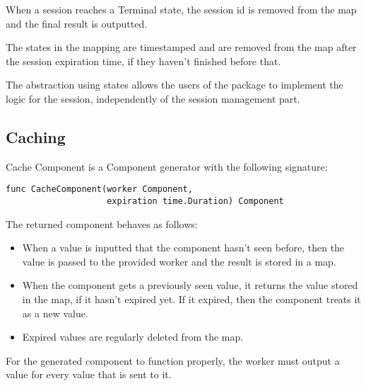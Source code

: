 \documentclass[12pt,a4paper]{article}
\begin{document}
When a session reaches a Terminal state, the session id is removed from the map
and the final result is outputted.

The states in the mapping are timestamped and are removed from the map after
the session expiration time, if they haven't finished before that.

The abstraction using states allows the users of the package to implement the
logic for the session, independently of the session management part.

\subsection{Caching}
Cache Component is a Component generator with the following signature:
\begin{lstlisting}
func CacheComponent(worker Component, 
					expiration time.Duration) Component
\end{lstlisting}
The returned component behaves as follows:
\begin{itemize}
	\item When a value is inputted that the component hasn't seen before, then
				the value is passed to the provided worker and the result is stored in
				a map.
	\item When the component gets a previously seen value, it returns the value
			  stored in the map, if it hasn't expired yet. If it expired, then the component
				treats it as a new value.
	\item Expired values are regularly deleted from the map.
\end{itemize}

For the generated component to function properly, the worker must output
a value for every value that is sent to it.
\end{document}
